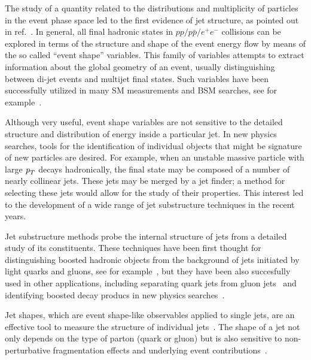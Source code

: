 The study of a quantity related to the distributions and multiplicity of particles in the event phase space led to the first evidence of jet structure, as pointed out in ref.~\cite{PhysRevLett.35.1609}. In general, all final hadronic states in $pp/p\bar{p}/e^+e^-$ collisions can be explored in terms of the structure and shape of the event energy flow by means of the so called ``event shape'' variables. This family of variables attempts to extract information about the global geometry of an event, usually distinguishing between di-jet events and multijet final states. Such variables have been successfully utilized in many SM measurements and BSM searches, see for example~\cite{Abbiendi:2007aa}\cite{Aad:2012np}. 

Although very useful, event shape variables are not sensitive to the detailed structure and distribution of energy inside a particular jet. In new physics searches, tools for the identification of individual objects that might be signature of new particles are desired. For example, when an unstable massive particle with large ${\emph{p}_{T}}$ decays hadronically, the final state may be composed of a number of nearly collinear jets. These jets may be merged by a jet finder; %
a method for selecting these jets would allow for the study of their properties.
  This interest led to the development of a wide range of jet substructure techniques in the recent years.

  Jet substructure methods probe the internal structure of jets from a detailed study of its constituents. These techniques have been first thought for distinguishing boosted hadronic objects from the background of jets initiated by light quarks and gluons, see for example~\cite{ATLASBoostedHbb},
but they have been also succesfully used in other applications, including separating quark jets from gluon jets~\cite{PhysRevLett.107.172001} and identifying boosted decay producs in new physics searches~\cite{PhysRevD.82.095012}.

Jet shapes, which are event shape-like observables applied to single jets, are an effective tool to measure the structure of individual jets~\cite{springerlink:10.1007/JHEP11(2010)101}.%
 The shape of a jet not only depends on the type of parton (quark or gluon) but is also sensitive to non-perturbative fragmentation effects and underlying event contributions~\cite{ATLASJetShapes}.


